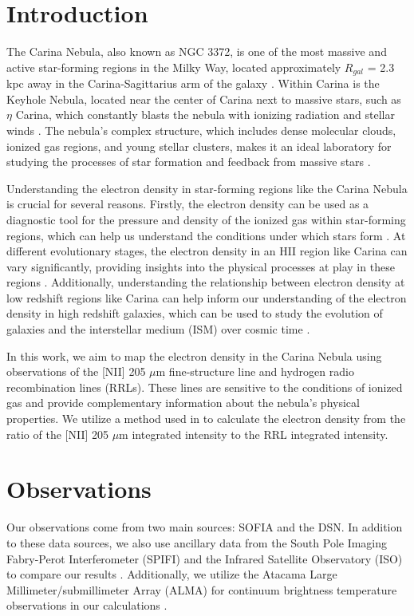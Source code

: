 \section{Introduction}
The Carina Nebula, also known as NGC 3372, is one of the most massive and active star-forming regions in the Milky Way, located approximately $R_{gal}$ = 2.3 kpc away in the Carina-Sagittarius arm of the galaxy \parencite{smith2006census}.
Within Carina is the Keyhole Nebula, located near the center of Carina next to massive stars, such as $\eta$ Carina, which constantly blasts the nebula with ionizing radiation and stellar winds \parencite{brooks2005simba}.
The nebula's complex structure, which includes dense molecular clouds, ionized gas regions, and young stellar clusters, makes it an ideal laboratory for studying the processes of star formation and feedback from massive stars \parencite{smith2007census}.

Understanding the electron density in star-forming regions like the Carina Nebula is crucial for several reasons. 
Firstly, the electron density can be used as a diagnostic tool for the pressure and density of the ionized gas within star-forming regions, which can help us understand the conditions under which stars form \parencite{kaasinen2016cosmos}.
At different evolutionary stages, the electron density in an HII region like Carina can vary significantly, providing insights into the physical processes at play in these regions \parencite{goldsmith2024electron}.
Additionally, understanding the relationship between electron density at low redshift regions like Carina can help inform our understanding of the electron density in high redshift galaxies, which can be used to study the evolution of galaxies and the interstellar medium (ISM) over cosmic time \parencite{shirazi2014stars}.

In this work, we aim to map the electron density in the Carina Nebula using observations of the [NII] 205 $\mu$m fine-structure line and hydrogen radio recombination lines (RRLs). 
These lines are sensitive to the conditions of ionized gas and provide complementary information about the nebula's physical properties. 
We utilize a method used in \cite{pineda2019electron} to calculate the electron density from the ratio of the [NII] 205 $\mu$m integrated intensity to the RRL integrated intensity.
\section{Observations}
Our observations come from two main sources: SOFIA and the DSN.
In addition to these data sources, we also use ancillary data from the South Pole Imaging Fabry-Perot Interferometer (SPIFI) and the Infrared Satellite Observatory (ISO) to compare our results \parencite{oberst2011205}.
Additionally, we utilize the Atacama Large Millimeter/submillimeter Array (ALMA) for continuum brightness temperature observations in our calculations \parencite{Rebolledo_2021}.

